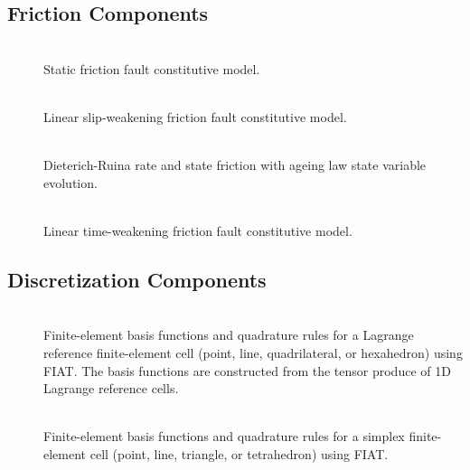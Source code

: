 \subsection{Friction Components}
\begin{description}
\item [] \\
Static friction fault constitutive model.
\item [] \\
Linear slip-weakening friction fault constitutive model.
\item [] \\
Dieterich-Ruina rate and state friction with ageing law state variable
evolution.
\item [] \\
Linear time-weakening friction fault constitutive model.
\end{description}

\subsection{Discretization Components}
\begin{description}
\item [] \\
Finite-element basis functions and quadrature rules for a Lagrange
reference finite-element cell (point, line, quadrilateral, or hexahedron)
using FIAT. The basis functions are constructed from the tensor produce
of 1D Lagrange reference cells.
\item [] \\
Finite-element basis functions and quadrature rules for a simplex
finite-element cell (point, line, triangle, or tetrahedron) using
FIAT.
\end{description}

